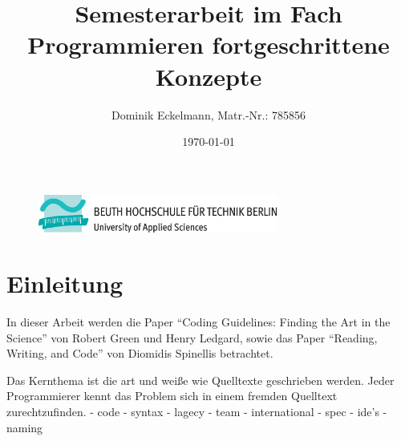 \documentclass[a4paper]{article}
\title{Semesterarbeit im Fach Programmieren fortgeschrittene Konzepte}
\author{Dominik Eckelmann, Matr.-Nr.: 785856}
\date{\today}
\begin{document}
\sloppy

\begin{figure}[H]
	\centering
	\includegraphics[width=0.7\textwidth]{beuth.eps}
	\maketitle
\end{figure}

\newpage
\tableofcontents

\newpage
\section{Einleitung}

In dieser Arbeit werden die Paper \enquote{Coding Guidelines: Finding the Art in the Science} von Robert Green und Henry Ledgard\cite{Green}, sowie das Paper \enquote{Reading, Writing, and Code} von Diomidis Spinellis betrachtet. 

Das Kernthema ist die art und weiße wie Quelltexte geschrieben werden. Jeder Programmierer kennt das Problem sich in einem fremden Quelltext zurechtzufinden.
\cite{Knuth}
 - code
 - syntax
 - lagecy
 - team
 - international
 - spec
 - ide's
 - naming











\appendix

\newpage

\nocite{*}
 
\printbibliography
{}

\newpage
 
\listoffigures

\newpage
 
\renewcommand\listoflistingscaption{Quellcodeverzeichnis}
\listoflistings
\end{document}
